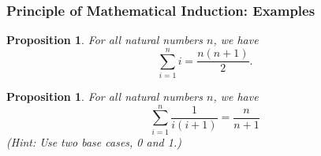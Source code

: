 \documentclass{beamer}
\newtheorem{prop}[thm]{Proposition}
\begin{document}
\begin{frame}
\frametitle{Principle of Mathematical Induction: Examples}

\begin{prop}
For all natural numbers $n$, we have \[ \sum_{i=1}^n i = \frac{n(n+1)}{2}. \]
\end{prop} \pause

\begin{prop}
For all natural numbers $n$, we have \[ \sum_{i=1}^n \frac{1}{i(i+1)} = \frac{n}{n+1} \] (Hint: Use two base cases, 0 and 1.)
\end{prop}
\end{frame}
\end{document}
